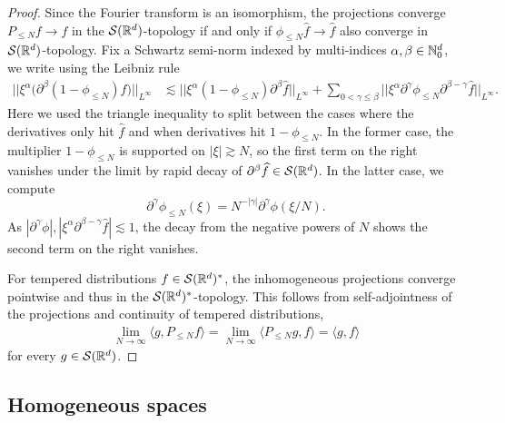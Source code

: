 \begin{proof}
	Since the Fourier transform is an isomorphism, the projections converge $P_{\leq N} f \to f$ in the $\mathcal S (\mathbb R^d)$-topology if and only if $\phi_{\leq N} \widehat f \to \widehat f$ also converge in $\mathcal S (\mathbb R^d)$-topology. Fix a Schwartz semi-norm indexed by multi-indices $\alpha, \beta \in \mathbb N^d_0$, we write using the Leibniz rule
		\begin{align*}
			 ||\xi^\alpha \Big( \partial^\beta (1 - \phi_{\leq N}) \widehat f \Big) ||_{L^\infty}
			 	&\lesssim ||\xi^\alpha (1 - \phi_{\leq N})\partial^\beta \widehat f||_{L^\infty} +  \sum_{0 < \gamma \leq \beta}||\xi^\alpha \partial^{\gamma}  \phi_{\leq N} \partial^{\beta - \gamma} \widehat f ||_{L^\infty} .
		\end{align*}	 
	Here we used the triangle inequality to split between the cases where the derivatives only hit $\widehat f$ and when derivatives hit $1 - \phi_{\leq N}$. In the former case, the multiplier $1 - \phi_{\leq N}$ is supported on $|\xi| \gtrsim N$, so the first term on the right vanishes under the limit by rapid decay of $\partial^\beta \widehat f \in \mathcal S (\mathbb R^d)$. In the latter case, we compute
		\[ \partial^\gamma \phi_{\leq N} (\xi) = N^{-|\gamma|} \partial^\gamma \phi (\xi/N). \]
	As $|\partial^\gamma \phi|, |\xi^\alpha \partial^{\beta - \gamma} \widehat f| \lesssim 1$, the decay from the negative powers of $N$ shows the second term on the right vanishes.
	
	For tempered distributions $f \in \mathcal S (\mathbb R^d)^*$, the inhomogeneous projections converge pointwise and thus in the $\mathcal S (\mathbb R^d)^*$-topology. This follows from self-adjointness of the projections and continuity of tempered distributions, 
		\begin{align*}
			\lim_{N \to \infty}\langle  g, P_{\leq N} f \rangle = \lim_{N \to \infty} \langle P_{\leq N} g, f \rangle = \langle g, f \rangle
		\end{align*}
	for every $g \in \mathcal S (\mathbb R^d)$. 
\end{proof}

\subsection{Homogeneous spaces}

